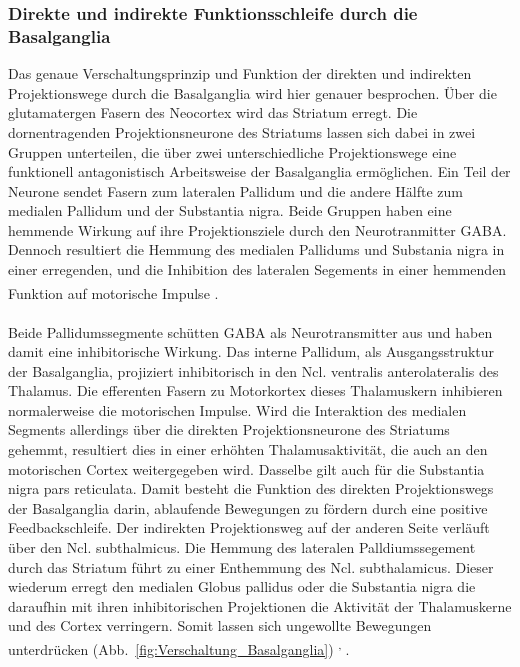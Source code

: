 \documentclass[12pt,a4paper,pdftex]{article}
\begin{document}
\subsubsection*{Direkte und indirekte Funktionsschleife durch die Basalganglia}
Das genaue Verschaltungsprinzip und Funktion der direkten und indirekten Projektionswege durch die Basalganglia wird hier genauer besprochen. Über die glutamatergen Fasern des Neocortex wird das Striatum erregt. Die dornentragenden Projektionsneurone des Striatums lassen sich dabei in zwei Gruppen unterteilen, die über zwei unterschiedliche Projektionswege eine funktionell antagonistisch Arbeitsweise der Basalganglia ermöglichen. Ein Teil der Neurone sendet Fasern zum lateralen Pallidum und die andere Hälfte zum medialen Pallidum und der Substantia nigra. Beide Gruppen haben eine hemmende Wirkung auf ihre Projektionsziele durch den Neurotranmitter GABA. Dennoch resultiert die Hemmung des medialen Pallidums und Substania nigra in einer erregenden, und die Inhibition des lateralen Segements in einer hemmenden Funktion auf motorische Impulse \textsuperscript{\cite[9]{trepel2011neuroanatomie}}. \\  
\\ \noindent Beide Pallidumssegmente schütten GABA als Neurotransmitter aus und haben damit eine inhibitorische Wirkung. Das interne Pallidum, als Ausgangsstruktur der Basalganglia, projiziert inhibitorisch in den Ncl. ventralis anterolateralis des Thalamus. Die efferenten Fasern zu Motorkortex dieses Thalamuskern inhibieren normalerweise die motorischen Impulse. Wird die Interaktion des medialen Segments allerdings über die direkten Projektionsneurone des Striatums gehemmt, resultiert dies in einer erhöhten Thalamusaktivität, die auch an den motorischen Cortex weitergegeben wird. Dasselbe gilt auch für die Substantia nigra pars reticulata. Damit besteht die Funktion des direkten Projektionswegs der Basalganglia darin, ablaufende Bewegungen zu fördern durch eine positive Feedbackschleife. Der indirekten Projektionsweg auf der anderen Seite verläuft über den Ncl. subthalmicus. Die Hemmung des lateralen Palldiumssegement durch das Striatum führt zu einer Enthemmung des Ncl. subthalamicus. Dieser wiederum erregt den medialen Globus pallidus oder die Substantia nigra die daraufhin mit ihren inhibitorischen Projektionen die Aktivität der Thalamuskerne und des Cortex verringern. Somit lassen sich ungewollte Bewegungen unterdrücken (Abb.~\ref{fig:Verschaltung_Basalganglia}) \textsuperscript{\cite[14]{crossman2014neuroanatomy}, \cite[9]{trepel2011neuroanatomie}}.\\ 
\end{document}
